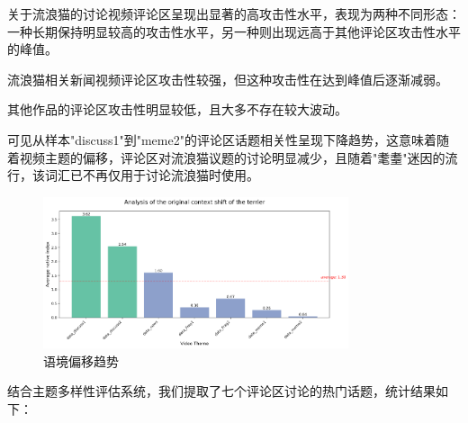\documentclass[12pt,a4paper]{ctexart}
\begin{document}
关于流浪猫的讨论视频评论区呈现出显著的高攻击性水平，表现为两种不同形态：一种长期保持明显较高的攻击性水平，另一种则出现远高于其他评论区攻击性水平的峰值。

流浪猫相关新闻视频评论区攻击性较强，但这种攻击性在达到峰值后逐渐减弱。

其他作品的评论区攻击性明显较低，且大多不存在较大波动。

可见从样本"discuss1"到"meme2"的评论区话题相关性呈现下降趋势，这意味着随着视频主题的偏移，评论区对流浪猫议题的讨论明显减少，且随着"耄耋"迷因的流行，该词汇已不再仅用于讨论流浪猫时使用。

\begin{figure}[htbp]
    \centering
    \includegraphics[width=0.8\textwidth]{img/context_shift.png}
    \caption{语境偏移趋势}
\end{figure}
\newpage

结合主题多样性评估系统，我们提取了七个评论区讨论的热门话题，统计结果如下：
\end{document}
